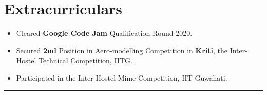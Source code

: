 \documentclass[a4paper,11pt]{article}
\begin{document}
\section{\textbf{Extracurriculars}}
\vspace{0.8mm}
\begin{itemize}[leftmargin=1em]  
    \item Cleared \textbf{Google Code Jam} Qualification Round 2020.
\end{itemize} 
\vspace{-5mm}
\begin{itemize}[leftmargin=1em]  
    \item Secured \textbf{2nd} Position in Aero-modelling Competition in \textbf{Kriti}, the Inter-Hostel Technical Competition, IITG. 
\end{itemize}
\vspace{-5mm}

\begin{itemize}[leftmargin=1em]  
    \item Participated in the Inter-Hostel Mime Competition, IIT Guwahati.
\end{itemize}
\vspace{-3mm}
\hspace*{-5mm}\rule{1.035\textwidth}{0.1mm}



\end{document}
